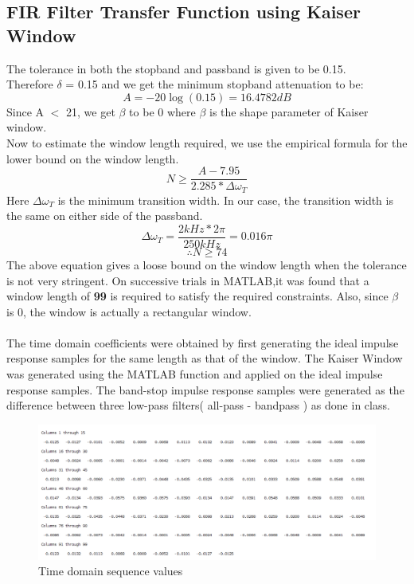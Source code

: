 \documentclass[12pt]{article}
\begin{document}
\subsection{FIR Filter Transfer Function using Kaiser Window}
The tolerance in both the stopband and passband is given to be 0.15.\\
Therefore $\delta$ = 0.15 and we get the  minimum stopband attenuation to be:
\begin{equation*}
A = -20\log (0.15) = 16.4782 dB
\end{equation*}
Since A $<$ 21, we get $\beta$ to be 0 where  $\beta$ is the shape parameter of Kaiser window.\\
Now to estimate the window length required, we use the empirical formula for the lower bound on the window length.
\begin{equation*}
N \geq \frac{A-7.95}{2.285*\Delta\omega _{T}}
\end{equation*}
Here $\Delta\omega _{T}$ is the minimum transition width. In our case, the transition width is the same on either side of the passband. 
\begin{equation*}
\Delta\omega _{T} = \frac{2 kHz * 2\pi}{250 kHz} =  0.016\pi
\end{equation*}
\begin{equation*}
\therefore N \geq 74
\end{equation*}
The above equation gives a loose bound on the window length when the tolerance is not very stringent. On successive trials in MATLAB,it was found that a window length of \textbf{99} is required to satisfy the required constraints. Also, since $\beta$ is 0, the window is actually a rectangular window.\\
\\The time domain coefficients were obtained by first generating the ideal impulse response samples for the same length as that of the window. The Kaiser Window was generated using the MATLAB function and applied on the ideal impulse response samples. The band-stop impulse response samples were generated as the difference between three low-pass filters( all-pass - bandpass ) as done in class.
\newpage
\begin{figure}[h!]
	\centering
    \includegraphics[width = 1\textwidth]{2firt.png}
    \caption{Time domain sequence values}
\end{figure}
\end{document}
